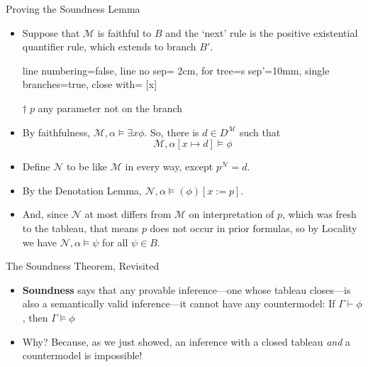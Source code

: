 \begin{frame}{Proving the Soundness Lemma}

\medskip

	\begin{itemize}
      \small
	\itemsep=10pt
	
	\item Suppose that $\mathcal{M}$ is faithful to $B$ and the `next' rule is the positive existential quantifier rule, which extends to branch $B'$.

	\begin{center}

			\begin{prooftree}
			{
			line numbering=false,
			line no sep= 2cm,
			for tree={s sep'=10mm},
			single branches=true,
			close with=\xmark
			}
			[\exists x\phi [\phi\lbrack x:\!{=}\, p\rbrack^\dagger ] ]
			\end{prooftree}

	$\dagger\; p$ any parameter not on the branch

	\end{center}
	          \item By faithfulness, $\mathcal{M},\alpha\vDash\exists x\phi$.
                  So, there is $d\in D^\mathcal{M}$ such that \[\mathcal{M},\alpha[x\mapsto d]\vDash \phi\]

            \item Define $\mathcal{N}$ to be like $\mathcal{M}$ in every way, except $p^\mathcal{N}=d$.

            \item By the Denotation Lemma,
                  $\mathcal{N},\alpha\vDash (\phi)[x:=p]$.

            \item And, since $\mathcal{N}$ at most differs from $\mathcal{M}$ on interpretation of $p$, which was fresh to the tableau, that means $p$ does not occur in prior formulas, so by Locality we have $\mathcal{N},\alpha\vDash \psi$ for all $\psi\in B$.
 
  \end{itemize}
  
\end{frame}

\begin{frame}{The Soundness Theorem, Revisited}

	\begin{itemize}%
	\itemsep=16pt

        \item \textbf{Soundness} says that any provable inference---one whose tableau closes---is also a semantically valid inference---it cannot have any countermodel: If $\Gamma\vdash\phi$, then $\Gamma\vDash\phi$
        
        \item Why? Because, as we just showed, an inference with a closed tableau \emph{and} a countermodel is impossible!
        
	\end{itemize}

\end{frame}


